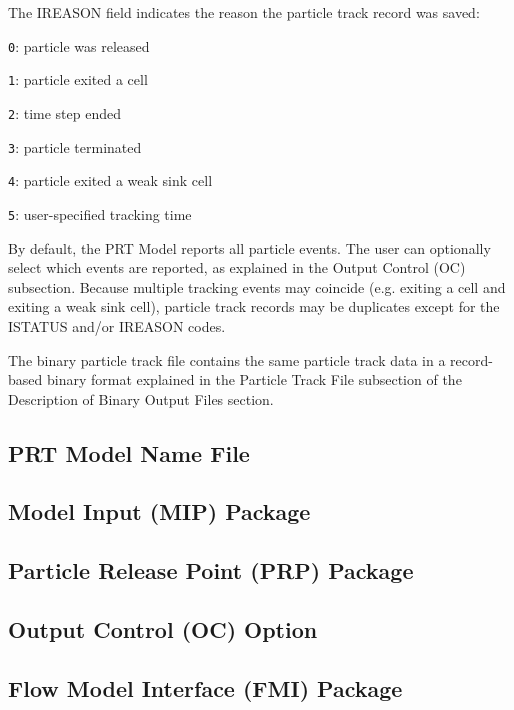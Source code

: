 The IREASON field indicates the reason the particle track record was saved:

\begin{description} \itemsep0pt \parskip0pt 
\item \texttt{0}: particle was released
\item \texttt{1}: particle exited a cell
\item \texttt{2}: time step ended
\item \texttt{3}: particle terminated
\item \texttt{4}: particle exited a weak sink cell
\item \texttt{5}: user-specified tracking time
\end{description}

By default, the PRT Model reports all particle events. The user can optionally select which events are reported, as explained in the Output Control (OC) subsection. Because multiple tracking events may coincide (e.g. exiting a cell and exiting a weak sink cell), particle track records may be duplicates except for the ISTATUS and/or IREASON codes.

The binary particle track file contains the same particle track data in a record-based binary format explained in the Particle Track File subsection of the Description of Binary Output Files section.





\newpage
\subsection{PRT Model Name File}


%

%

%

\newpage
\subsection{Model Input (MIP) Package}


\newpage
\subsection{Particle Release Point (PRP) Package}


\newpage
\subsection{Output Control (OC) Option}


\newpage
\subsection{Flow Model Interface (FMI) Package}

